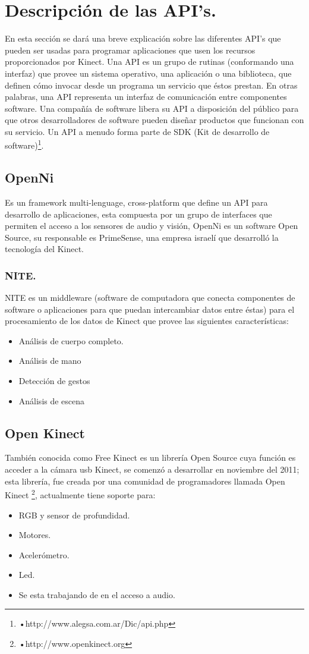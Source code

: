 \documentclass[11pt,a4paper]{article}
\begin{document}
\section{Descripción de las API's.}
En esta sección se dará una breve explicación sobre las diferentes API's que pueden ser usadas para programar aplicaciones que usen los recursos proporcionados por Kinect. \newline
Una API es un grupo de rutinas (conformando una interfaz) que provee un sistema operativo, una aplicación o una biblioteca, que definen cómo invocar desde  un programa un servicio que éstos prestan. En otras palabras, una API representa un interfaz de comunicación entre componentes software. Una compañía de software libera su API a disposición del público para que otros desarrolladores de software pueden diseñar productos que funcionan con su servicio. Un API a menudo forma parte de SDK (Kit de desarrollo de software)\footnote{•http://www.alegsa.com.ar/Dic/api.php}.

\subsection{OpenNi}
Es un framework multi-lenguage, cross-platform que define un API para desarrollo de aplicaciones, esta compuesta por un grupo de interfaces que permiten el acceso a los sensores de audio y visión, OpenNi es un software Open Source, su responsable es PrimeSense, una empresa israelí que desarrolló la tecnología del Kinect.

\subsubsection{NITE.}
NITE es un middleware (software de computadora  que conecta componentes de software o aplicaciones para que puedan intercambiar datos entre éstas) para el procesamiento de los datos de Kinect que provee las siguientes características:
\begin{itemize}
\item Análisis de cuerpo completo.
\item Análisis de mano
\item Detección de gestos 
\item Análisis de escena 
\end{itemize} 

\subsection{Open Kinect}
También conocida como Free Kinect es un librería Open Source cuya función es acceder a la cámara usb Kinect, se comenzó a desarrollar en noviembre del 2011; esta librería, fue creada por una comunidad de programadores llamada Open Kinect \footnote{•http://www.openkinect.org}, actualmente tiene soporte para:
\begin{itemize}
\item RGB y sensor de profundidad.
\item Motores.
\item Acelerómetro.
\item Led.
\item Se esta trabajando de en el acceso a audio.
\end{itemize}
\end{document}
